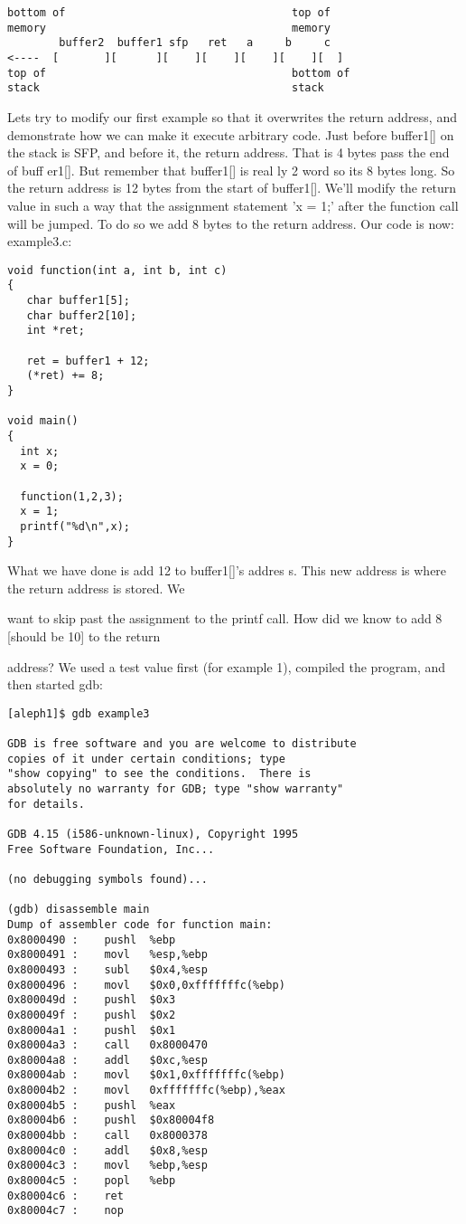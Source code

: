 \documentclass[12pt]{article}
\begin{document}
{\small
\begin{verbatim}
bottom of                                   top of
memory                                      memory
        buffer2  buffer1 sfp   ret   a     b     c
<----  [       ][      ][    ][    ][    ][    ][  ]
top of                                      bottom of
stack                                       stack
\end{verbatim}
}
Lets try to modify our first example so that it overwrites the return address, and demonstrate how we can make 
it execute arbitrary code. Just before buffer1[] on the stack is SFP, and before it, the return address. That is 4 
bytes pass the end of buff er1[]. But remember that buffer1[] is real ly 2 word so its 8 bytes long. So the return 
address is 12 bytes from the start of buffer1[]. We'll modify the return value in such a way that the assignment 
statement 'x = 1;' after the function call will be jumped. To do so we add 8 bytes to the return address. 
Our code is now: example3.c:

\begin{lstlisting}
void function(int a, int b, int c) 
{
   char buffer1[5];
   char buffer2[10];
   int *ret;

   ret = buffer1 + 12;
   (*ret) += 8;
}

void main() 
{
  int x;
  x = 0;

  function(1,2,3);
  x = 1;
  printf("%d\n",x);
}
\end{lstlisting}

What we have done is add 12 to buffer1[]'s addres s. This new address is where the return address is stored. We 

want to skip past the assignment to the printf call. How did we know to add 8 [should be 10] to the return 

address? We used a test value first (for example 1), compiled the program, and  then started gdb:

{\small
\begin{verbatim}
[aleph1]$ gdb example3

GDB is free software and you are welcome to distribute 
copies of it under certain conditions; type 
"show copying" to see the conditions.  There is 
absolutely no warranty for GDB; type "show warranty" 
for details.

GDB 4.15 (i586-unknown-linux), Copyright 1995 
Free Software Foundation, Inc...

(no debugging symbols found)...

(gdb) disassemble main
Dump of assembler code for function main:
0x8000490 :    pushl  %ebp
0x8000491 :    movl   %esp,%ebp
0x8000493 :    subl   $0x4,%esp
0x8000496 :    movl   $0x0,0xfffffffc(%ebp)
0x800049d :    pushl  $0x3
0x800049f :    pushl  $0x2
0x80004a1 :    pushl  $0x1
0x80004a3 :    call   0x8000470 
0x80004a8 :    addl   $0xc,%esp
0x80004ab :    movl   $0x1,0xfffffffc(%ebp)
0x80004b2 :    movl   0xfffffffc(%ebp),%eax
0x80004b5 :    pushl  %eax
0x80004b6 :    pushl  $0x80004f8
0x80004bb :    call   0x8000378 
0x80004c0 :    addl   $0x8,%esp
0x80004c3 :    movl   %ebp,%esp
0x80004c5 :    popl   %ebp
0x80004c6 :    ret
0x80004c7 :    nop
\end{verbatim}
}
\end{document}
